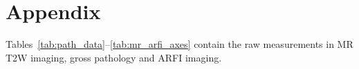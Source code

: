 \section{Appendix}\label{sect:appendix}

Tables~\ref{tab:path_data}--\ref{tab:mr_arfi_axes} contain the raw measurements in 
MR T2W imaging, gross pathology and ARFI imaging.



\clearpage


\clearpage

